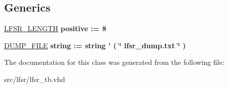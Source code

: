 \subsection*{Generics}
 \begin{DoxyCompactItemize}
\item 
\hypertarget{classlfsr__tb_a7dd564a173315445201d6e4a97b36a64}{\hyperlink{classlfsr__tb_a7dd564a173315445201d6e4a97b36a64}{L\-F\-S\-R\-\_\-\-L\-E\-N\-G\-T\-H} {\bfseries {\bfseries \textcolor{vhdlchar}{positive}\textcolor{vhdlchar}{ }\textcolor{vhdlchar}{\-:}\textcolor{vhdlchar}{=}\textcolor{vhdlchar}{ } \textcolor{vhdldigit}{8} \textcolor{vhdlchar}{ }}}}\label{classlfsr__tb_a7dd564a173315445201d6e4a97b36a64}

\item 
\hypertarget{classlfsr__tb_ae5f49eba61f25213abee8b3c9f9e41cc}{\hyperlink{classlfsr__tb_ae5f49eba61f25213abee8b3c9f9e41cc}{D\-U\-M\-P\-\_\-\-F\-I\-L\-E} {\bfseries {\bfseries \textcolor{comment}{string}\textcolor{vhdlchar}{ }\textcolor{vhdlchar}{\-:}\textcolor{vhdlchar}{=}\textcolor{vhdlchar}{ }\textcolor{comment}{string}\textcolor{vhdlchar}{ }\textcolor{vhdlchar}{'}\textcolor{vhdlchar}{ }\textcolor{vhdlchar}{(}\textcolor{vhdlchar}{ }\textcolor{keyword}{\char`\"{} lfsr\-\_\-dump.\-txt \char`\"{}}\textcolor{vhdlchar}{ }\textcolor{vhdlchar}{ }\textcolor{vhdlchar}{)}\textcolor{vhdlchar}{ }}}}\label{classlfsr__tb_ae5f49eba61f25213abee8b3c9f9e41cc}

\end{DoxyCompactItemize}


The documentation for this class was generated from the following file\-:\begin{DoxyCompactItemize}
\item 
src/lfsr/lfsr\-\_\-tb.\-vhd\end{DoxyCompactItemize}

